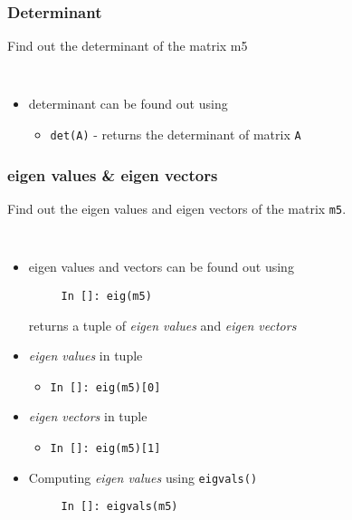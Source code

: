 \documentclass[presentation]{beamer}
\begin{document}
\begin{frame}[fragile]
\frametitle{Determinant}
\label{sec-13}

  Find out the determinant of the matrix m5
\begin{verbatim}
   
\end{verbatim}

\begin{itemize}
\item determinant can be found out using

\begin{itemize}
\item \texttt{det(A)} - returns the determinant of matrix \texttt{A}
\end{itemize}

\end{itemize}
\end{frame}
\begin{frame}[fragile]
\frametitle{eigen values \& eigen vectors}
\label{sec-14}

  Find out the eigen values and eigen vectors of the matrix \texttt{m5}.
\begin{verbatim}
   
\end{verbatim}

\begin{itemize}
\item eigen values and vectors can be found out using
\begin{verbatim}
     In []: eig(m5)
\end{verbatim}

    returns a tuple of \emph{eigen values} and \emph{eigen vectors}
\item \emph{eigen values} in tuple

\begin{itemize}
\item \texttt{In []: eig(m5)[0]}
\end{itemize}

\item \emph{eigen vectors} in tuple

\begin{itemize}
\item \texttt{In []: eig(m5)[1]}
\end{itemize}

\item Computing \emph{eigen values} using \texttt{eigvals()}
\begin{verbatim}
     In []: eigvals(m5)
\end{verbatim}

\end{itemize}
\end{frame}
\end{document}

